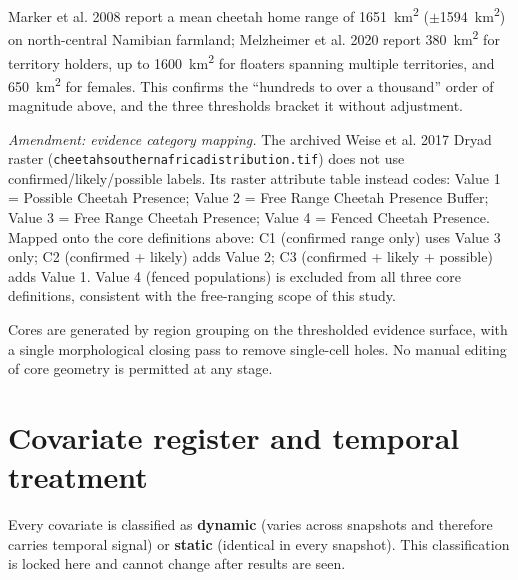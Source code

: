  Marker et al. 2008 report a mean cheetah home
range of \SI{1651}{\kilo\metre\squared} ($\pm$\SI{1594}{\kilo\metre\squared}) on
north-central Namibian farmland; Melzheimer et al. 2020 report
\SI{380}{\kilo\metre\squared} for territory holders, up to
\SI{1600}{\kilo\metre\squared} for floaters spanning multiple territories, and
\SI{650}{\kilo\metre\squared} for females. This confirms the ``hundreds to over
a thousand'' order of magnitude above, and the three thresholds bracket it
without adjustment.

\emph{Amendment: evidence category mapping.} The archived Weise et al. 2017
Dryad raster (\texttt{cheetahsouthernafricadistribution.tif}) does not use
confirmed/likely/possible labels. Its raster attribute table instead codes:
Value 1 = Possible Cheetah Presence; Value 2 = Free Range Cheetah Presence
Buffer; Value 3 = Free Range Cheetah Presence; Value 4 = Fenced Cheetah
Presence. Mapped onto the core definitions above: C1 (confirmed range only)
uses Value 3 only; C2 (confirmed + likely) adds Value 2; C3 (confirmed + likely
+ possible) adds Value 1. Value 4 (fenced populations) is excluded from all
three core definitions, consistent with the free-ranging scope of this study.

Cores are generated by region grouping on the thresholded evidence surface, with
a single morphological closing pass to remove single-cell holes. No manual
editing of core geometry is permitted at any stage.

\section{Covariate register and temporal treatment}

Every covariate is classified as \textbf{dynamic} (varies across snapshots and
therefore carries temporal signal) or \textbf{static} (identical in every
snapshot). This classification is locked here and cannot change after results
are seen.


